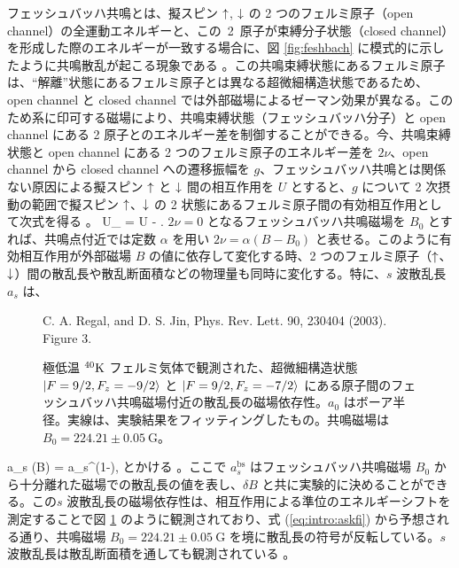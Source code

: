 フェッシュバッハ共鳴とは、擬スピン $\uparrow$, $\downarrow$ の 2 つのフェルミ原子（open channel）の全運動エネルギーと、この~2~原子が束縛分子状態（closed channel）を形成した際のエネルギーが一致する場合に、図 \ref{fig:feshbach} に模式的に示したように共鳴散乱が起こる現象である \cite{feshbach1962}。この共鳴束縛状態にあるフェルミ原子は、“解離”状態にあるフェルミ原子とは異なる超微細構造状態であるため、open channel と closed channel では外部磁場によるゼーマン効果が異なる。このため系に印可する磁場により、共鳴束縛状態（フェッシュバッハ分子）と open channel にある 2 原子とのエネルギー差を制御することができる。今、共鳴束縛状態と open channel にある 2 つのフェルミ原子のエネルギー差を $2 \nu$、open channel から closed channel への遷移振幅を $g$、フェッシュバッハ共鳴とは関係ない原因による擬スピン $\uparrow$ と $\downarrow$ 間の相互作用を $U$ とすると、$g$ について 2 次摂動の範囲で擬スピン $\uparrow$、$\downarrow$ の 2 状態にあるフェルミ原子間の有効相互作用として次式を得る \cite{ohashi2005}。
\beq
U_{} = U - .\label{eq:intro:ueff}
\eeq
$2\nu=0$ となるフェッシュバッハ共鳴磁場を $B_0$ とすれば、共鳴点付近では定数 $\alpha$ を用い $2 \nu = \alpha (B-B_0)$ と表せる。このように有効相互作用が外部磁場 $B$ の値に依存して変化する時、2 つのフェルミ原子（$\uparrow$、$\downarrow$）間の散乱長や散乱断面積などの物理量も同時に変化する。特に、$s$ 波散乱長 $a_s$ は、
\begin{figure}[t]
\centering
\vspace{24mm}
C. A. Regal, and D. S. Jin, Phys. Rev. Lett. 90, 230404 (2003).\\
Figure 3.
\vspace{24mm}
\caption{極低温 ${}^{40}\mathrm{K}$ フェルミ気体で観測された、超微細構造状態 $\ket{F=9/2,F_z=-9/2}$ と $\ket{F=9/2, F_z=-7/2}$ にある原子間のフェッシュバッハ共鳴磁場付近の散乱長の磁場依存性\cite{regal2003}。$a_0$ はボーア半径。実線は、実験結果をフィッティングしたもの。共鳴磁場は $B_0=224.21\pm0.05\  \text{G}$。}
\label{fig:sscatter}
\end{figure}
\beq
a_s (B) = a_s^{}\left(1-\right),\label{eq:intro:askfi}
\eeq
とかける \cite{pethick2008}。ここで $a_s^{\text{bs}}$ はフェッシュバッハ共鳴磁場 $B_0$ から十分離れた磁場での散乱長の値を表し、$\delta B$ と共に実験的に決めることができる。この$s$ 波散乱長の磁場依存性は、相互作用による準位のエネルギーシフトを測定することで図 \ref{fig:sscatter} のように観測されており、式 (\ref{eq:intro:askfi}) から予想される通り、共鳴磁場 $B_0=224.21\pm0.05\  \text{G}$ を境に散乱長の符号が反転している。$s$ 波散乱長は散乱断面積を通しても観測されている \cite{loftus2002}。

